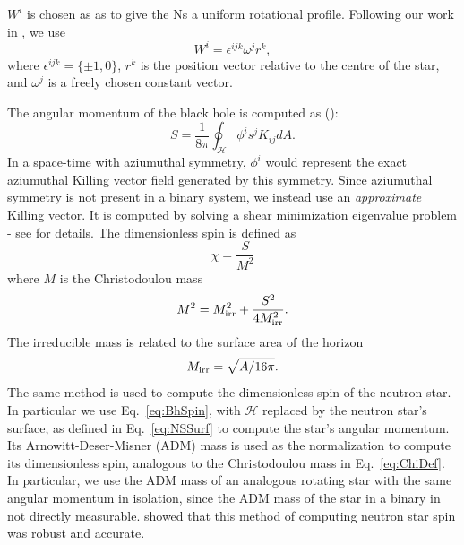 $W^i$ is chosen as as to give the Ns a uniform rotational
profile. Following our work in \cite{Tacik:2015tja}, we use
\begin{equation}
\label{eq:RotationTerm}
W^i=\epsilon^{ijk}\omega^jr^k,
\end{equation}
where $\epsilon^{ijk}=\{\pm1,0\}$, $r^k$ is the position vector relative to the centre of the star, and $\omega^j$ is a freely chosen constant vector.

The angular momentum of the black hole is computed as  (\cite{FoucartEtAl:2008}):
\begin{equation}
\label{eq:BhSpin}
S=\frac{1}{8\pi}\oint_{\mathcal{H}}\phi^is^jK_{ij}dA
.
\end{equation}
 In a space-time with aziumuthal symmetry, $\phi^i$ would represent
 the exact aziumuthal Killing vector field generated by this symmetry.
Since aziumuthal symmetry is not present in a binary system, we
instead use an {\it approximate} Killing vector. It is computed by solving a
shear minimization eigenvalue problem - see
\cite{Cook2007,Lovelace2008}  for details. The dimensionless spin is defined as
\begin{equation}
\label{eq:ChiDef}
\chi=\frac{S}{M^2}
\end{equation}
where $M$ is the Christodoulou mass
\begin{equation}
M^2=M_{\rm irr}^2+\frac{S^2}{4M_{\rm irr}^2}.
\end{equation}
The irreducible mass is related to the surface area of the horizon
\begin{equation}
M_{\rm irr}=\sqrt{A/16\pi}.
\end{equation}
The same method is used to compute the dimensionless spin of the
neutron star. In particular we use Eq.~\ref{eq:BhSpin}, with
$\mathcal{H}$ replaced by the neutron star's surface, as defined in
Eq.~\ref{eq:NSSurf} to compute the star's angular momentum. Its
Arnowitt-Deser-Misner (ADM) mass is used as the normalization to
compute its dimensionless spin, analogous to the Christodoulou mass in
Eq.~\ref{eq:ChiDef}. In particular, we use the ADM mass of
an analogous rotating star with the same angular momentum in
isolation, since the ADM mass of the star in a binary in not directly
measurable. \cite{Tacik:2015tja} showed that this method of computing
neutron star spin was robust and accurate.


